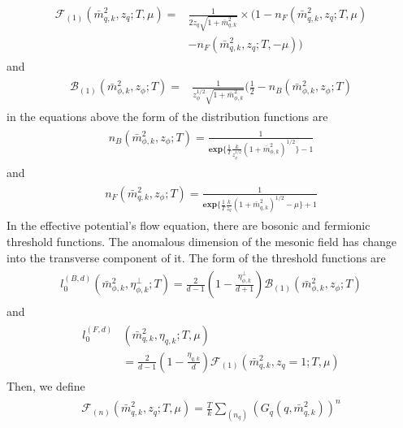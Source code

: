 \documentclass[%
reprint,
superscriptaddress,
showpacs,preprintnumbers,
 amsmath,amssymb,
 aps,
prd,
]{revtex4-1}
\begin{document}
\begin{align}
\begin{split}
\mathcal{F}_{(1)}(\bar{m}^{2}_{q,k},z_q;T,\mu)=&\frac{1}{2z_q\sqrt{1+\bar{m}^{2}_{q,k}}}\times(1-n_F(\bar{m}^{2}_{q,k},z_q
;T,\mu)\\&-n_F(\bar{m}^{2}_{q,k},z_q;T,-\mu))
\end{split}
\end{align} 
and
\begin{align}
\begin{split}
\mathcal{B}_{(1)}(\bar{m}^{2}_{\phi,k},z_\phi;T)=&\frac{1}{z_\phi^{1/2}\sqrt{1+\bar{m}^{2}_{\phi,k}}}
(\frac{1}{2}-n_B(\bar{m}^{2}_{\phi,k},z_\phi;T)
\end{split}
\end{align} 
in the equations above the form of the distribution functions are
\begin{align}
\begin{split}
n_B(\bar{m}^{2}_{\phi,k},z_\phi;T)=\frac{1}{\mathbf{exp}\lbrace \frac{1}{T}\frac{k}{z_\phi^{1/2}}(1+\bar{m}^{2}_{\phi,k})^{1/2} 
\rbrace-1}
\end{split}
\end{align} 
and
\begin{align}
\begin{split}
n_F(\bar{m}^{2}_{q,k},z_\phi;T)=\frac{1}{\mathbf{exp}\lbrace \frac{1}{T}\frac{k}{z_q}(1+\bar{m}^{2}_{q,k})^{1/2}-\mu 
\rbrace+1}
\end{split}
\end{align} 
In the effective potential's flow equation, there are bosonic and fermionic threshold functions. The anomalous dimension 
of the mesonic field has change into the transverse component of it. The form of the threshold functions are
\begin{align}
\begin{split}
l_0^{(B,d)}(\bar{m}^{2}_{\phi,k},\eta^\bot_{\phi,k};T)=\frac{2}{d-1}\left( 1- \frac{\eta^{\bot}_{\phi,k}}{d+1}\right) 
\mathcal{B}_{(1)}(\bar{m}^{2}_{\phi,k},z_\phi;T)
\end{split}
\end{align} 
and
\begin{align}
\begin{split}
l_0^{(F,d)}&(\bar{m}^{2}_{q,k},\eta_{q,k};T,\mu)\\&=\frac{2}{d-1}\left( 1-\frac{\eta_{q,k}}{d} \right)\mathcal{F}_{(1)}
(\bar{m}^{2}_{q,k},z_q=1;T,\mu)
\end{split}
\end{align} 
Then, we define
\begin{align}
\begin{split}
\mathcal{F}_{(n)}(\bar{m}^{2}_{q,k},z_q;T,\mu)=\frac{T}{k}\sum_{(n_q)}(G_q(q,\bar{m}^{2}_{q,k}))^n
\end{split}
\end{align} 
\end{document}
